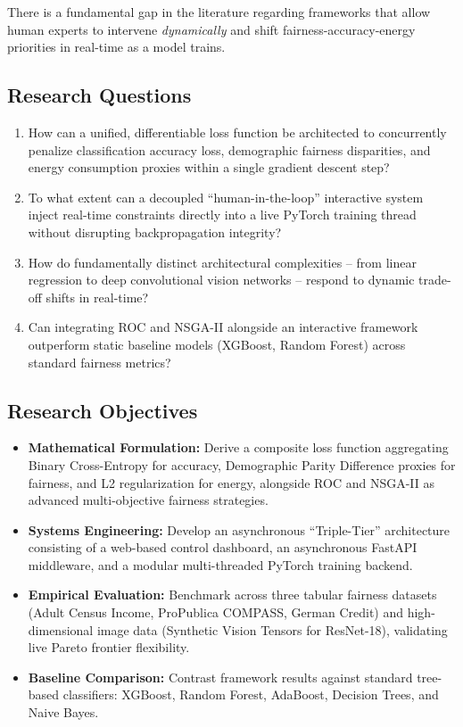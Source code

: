 \documentclass[12pt,a4paper]{article}
\begin{document}
There is a fundamental gap in the literature regarding frameworks that allow human experts to intervene \textit{dynamically} and shift fairness-accuracy-energy priorities in real-time as a model trains.

\subsection{Research Questions}

\begin{enumerate}
    \item How can a unified, differentiable loss function be architected to concurrently penalize classification accuracy loss, demographic fairness disparities, and energy consumption proxies within a single gradient descent step?
    \item To what extent can a decoupled ``human-in-the-loop'' interactive system inject real-time constraints directly into a live PyTorch training thread without disrupting backpropagation integrity?
    \item How do fundamentally distinct architectural complexities -- from linear regression to deep convolutional vision networks -- respond to dynamic trade-off shifts in real-time?
    \item Can integrating ROC and NSGA-II alongside an interactive framework outperform static baseline models (XGBoost, Random Forest) across standard fairness metrics?
\end{enumerate}

\subsection{Research Objectives}

\begin{itemize}
    \item \textbf{Mathematical Formulation:} Derive a composite loss function aggregating Binary Cross-Entropy for accuracy, Demographic Parity Difference proxies for fairness, and L2 regularization for energy, alongside ROC and NSGA-II as advanced multi-objective fairness strategies.
    \item \textbf{Systems Engineering:} Develop an asynchronous ``Triple-Tier'' architecture consisting of a web-based control dashboard, an asynchronous FastAPI middleware, and a modular multi-threaded PyTorch training backend.
    \item \textbf{Empirical Evaluation:} Benchmark across three tabular fairness datasets (Adult Census Income, ProPublica COMPASS, German Credit) and high-dimensional image data (Synthetic Vision Tensors for ResNet-18), validating live Pareto frontier flexibility.
    \item \textbf{Baseline Comparison:} Contrast framework results against standard tree-based classifiers: XGBoost, Random Forest, AdaBoost, Decision Trees, and Naive Bayes.
\end{itemize}
\end{document}

